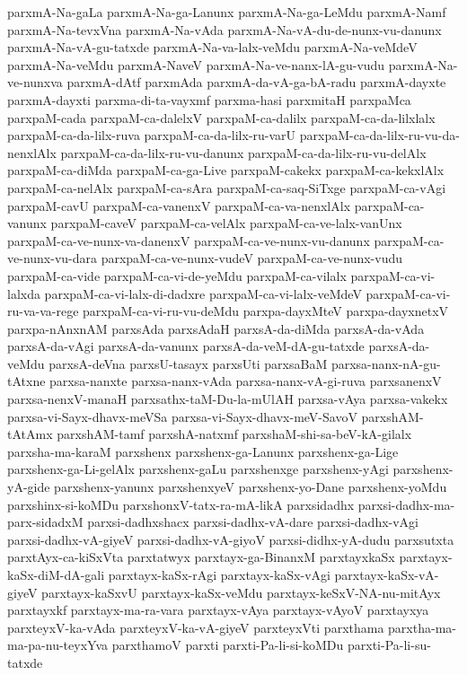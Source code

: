 {parxmA-Na-gaLa
parxmA-Na-ga-Lanunx
parxmA-Na-ga-LeMdu
parxmA-Namf
parxmA-Na-tevxVna
parxmA-Na-vAda
parxmA-Na-vA-du-de-nunx-vu-danunx
parxmA-Na-vA-gu-tatxde
parxmA-Na-va-lalx-veMdu
parxmA-Na-veMdeV
parxmA-Na-veMdu
parxmA-NaveV
parxmA-Na-ve-nanx-lA-gu-vudu
parxmA-Na-ve-nunxva
parxmA-dAtf
parxmAda
parxmA-da-vA-ga-bA-radu
parxmA-dayxte
parxmA-dayxti
parxma-di-ta-vayxmf
parxma-hasi
parxmitaH
parxpaMca
parxpaM-cada
parxpaM-ca-dalelxV
parxpaM-ca-dalilx
parxpaM-ca-da-lilxlalx
parxpaM-ca-da-lilx-ruva
parxpaM-ca-da-lilx-ru-varU
parxpaM-ca-da-lilx-ru-vu-da-nenxlAlx
parxpaM-ca-da-lilx-ru-vu-danunx
parxpaM-ca-da-lilx-ru-vu-delAlx
parxpaM-ca-diMda
parxpaM-ca-ga-Live
parxpaM-cakekx
parxpaM-ca-kekxlAlx
parxpaM-ca-nelAlx
parxpaM-ca-sAra
parxpaM-ca-saq-SiTxge
parxpaM-ca-vAgi
parxpaM-cavU
parxpaM-ca-vanenxV
parxpaM-ca-va-nenxlAlx
parxpaM-ca-vanunx
parxpaM-caveV
parxpaM-ca-velAlx
parxpaM-ca-ve-lalx-vanUnx
parxpaM-ca-ve-nunx-va-danenxV
parxpaM-ca-ve-nunx-vu-danunx
parxpaM-ca-ve-nunx-vu-dara
parxpaM-ca-ve-nunx-vudeV
parxpaM-ca-ve-nunx-vudu
parxpaM-ca-vide
parxpaM-ca-vi-de-yeMdu
parxpaM-ca-vilalx
parxpaM-ca-vi-lalxda
parxpaM-ca-vi-lalx-di-dadxre
parxpaM-ca-vi-lalx-veMdeV
parxpaM-ca-vi-ru-va-va-rege
parxpaM-ca-vi-ru-vu-deMdu
parxpa-dayxMteV
parxpa-dayxnetxV
parxpa-nAnxnAM
parxsAda
parxsAdaH
parxsA-da-diMda
parxsA-da-vAda
parxsA-da-vAgi
parxsA-da-vanunx
parxsA-da-veM-dA-gu-tatxde
parxsA-da-veMdu
parxsA-deVna
parxsU-tasayx
parxsUti
parxsaBaM
parxsa-nanx-nA-gu-tAtxne
parxsa-nanxte
parxsa-nanx-vAda
parxsa-nanx-vA-gi-ruva
parxsanenxV
parxsa-nenxV-manaH
parxsathx-taM-Du-la-mUlAH
parxsa-vAya
parxsa-vakekx
parxsa-vi-Sayx-dhavx-meVSa
parxsa-vi-Sayx-dhavx-meV-SavoV
parxshAM-tAtAmx
parxshAM-tamf
parxshA-natxmf
parxshaM-shi-sa-beV-kA-gilalx
parxsha-ma-karaM
parxshenx
parxshenx-ga-Lanunx
parxshenx-ga-Lige
parxshenx-ga-Li-gelAlx
parxshenx-gaLu
parxshenxge
parxshenx-yAgi
parxshenx-yA-gide
parxshenx-yanunx
parxshenxyeV
parxshenx-yo-Dane
parxshenx-yoMdu
parxshinx-si-koMDu
parxshonxV-tatx-ra-mA-likA
parxsidadhx
parxsi-dadhx-ma-parx-sidadxM
parxsi-dadhxshacx
parxsi-dadhx-vA-dare
parxsi-dadhx-vAgi
parxsi-dadhx-vA-giyeV
parxsi-dadhx-vA-giyoV
parxsi-didhx-yA-dudu
parxsutxta
parxtAyx-ca-kiSxVta
parxtatwyx
parxtayx-ga-BinanxM
parxtayxkaSx
parxtayx-kaSx-diM-dA-gali
parxtayx-kaSx-rAgi
parxtayx-kaSx-vAgi
parxtayx-kaSx-vA-giyeV
parxtayx-kaSxvU
parxtayx-kaSx-veMdu
parxtayx-keSxV-NA-nu-mitAyx
parxtayxkf
parxtayx-ma-ra-vara
parxtayx-vAya
parxtayx-vAyoV
parxtayxya
parxteyxV-ka-vAda
parxteyxV-ka-vA-giyeV
parxteyxVti
parxthama
parxtha-ma-ma-pa-nu-teyxYva
parxthamoV
parxti
parxti-Pa-li-si-koMDu
parxti-Pa-li-su-tatxde
}
